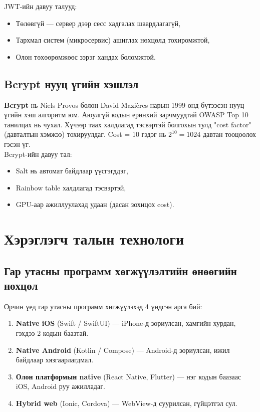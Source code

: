 JWT-ийн давуу талууд:
\begin{itemize}
    \item Төлөвгүй --- сервер дээр сесс хадгалах шаардлагагүй,
    \item Тархмал систем (микросервис) ашиглах нөхцөлд тохиромжтой,
    \item Олон төхөөрөмжөөс зэрэг хандах боломжтой.
\end{itemize}

\subsection{Bcrypt нууц үгийн хэшлэл}
\textbf{Bcrypt} \cite{bcrypt} нь Niels Provos болон David Mazi\`{e}res нарын 1999 онд бүтээсэн нууц үгийн хэш алгоритм юм. Аюулгүй кодын ерөнхий зарчмуудтай OWASP Top 10 \cite{owasp} танилцах нь чухал. Хүчээр таах халдлагад тэсвэртэй болгохын тулд "cost factor" (давталтын хэмжээ) тохируулдаг. Cost = 10 гэдэг нь $2^{10} = 1024$ давтан тооцоолох гэсэн үг.\\

Bcrypt-ийн давуу тал:
\begin{itemize}
    \item Salt нь автомат байдлаар үүсгэгддэг,
    \item Rainbow table халдлагад тэсвэртэй,
    \item GPU-аар ажиллуулахад удаан (дасан зохицох cost).
\end{itemize}

\section{Хэрэглэгч талын технологи}

\subsection{Гар утасны программ хөгжүүлэлтийн өнөөгийн нөхцөл}
Орчин үед гар утасны программ хөгжүүлэхэд 4 үндсэн арга бий:
\begin{enumerate}
    \item \textbf{Native iOS} (Swift / SwiftUI) --- iPhone-д зориулсан, хамгийн хурдан, гэхдээ 2 кодын баазтай.
    \item \textbf{Native Android} (Kotlin / Compose) --- Android-д зориулсан, ижил байдлаар хязгаарлагдмал.
    \item \textbf{Олон платформын native} (React Native, Flutter) --- нэг кодын баазаас iOS, Android руу ажилладаг.
    \item \textbf{Hybrid web} (Ionic, Cordova) --- WebView-д суурилсан, гүйцэтгэл сул.
\end{enumerate}

